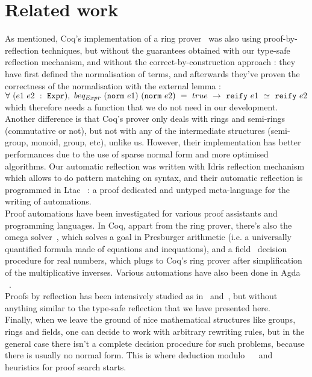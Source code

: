 \section{Related work}
\label{sect:relatedWork}

As mentioned, Coq's implementation of a ring prover~\cite{Coq2005} was also using proof-by-reflection techniques, but without the guarantees obtained with our type-safe reflection mechanism, and without the correct-by-construction approach : they have first defined the normalisation of terms, and afterwards they've proven the correctness of the normalisation with the external lemma :
$\forall\ (e1\ e2\ :\ \code{Expr}),\ beq_{Expr}\ (\code{norm}\ e1)\ (\code{norm}\ e2)\ =\ true\ \rightarrow\ \code{reify}\ e1\ \simeq\ \code{reify}\ e2$ which therefore needs a  function that we do not need in our development. Another difference is that Coq's prover only deals with rings and semi-rings (commutative or not), but not with any of the intermediate structures (semi-group, monoid, group, etc), unlike us. However, their implementation has better performances due to the use of sparse normal form and more optimised algorithms.
Our automatic reflection was written with Idris reflection mechanism which allows to do pattern matching on syntax, and their automatic reflection is programmed in Ltac~\cite{DelahayeLTac} : a proof dedicated and untyped meta-language for the writing of automations. \\

Proof automations have been investigated for various proof assistants and programming languages. In Coq, appart from the ring prover, there's also the omega solver~\cite{Cregut04}, which solves a goal in Presburger arithmetic (i.e. a universally quantified formula made of equations and inequations), and a field~\cite{DelahayeField} decision procedure for real numbers, which plugs to Coq's ring prover after simplification of the multiplicative inverses. Various automations have also been done in Agda~\cite{DBLP:conf/mpc/KokkeS15} ~\cite{Lindblad04}. \\

Proofs by reflection has been intensively studied as in~\cite{ChlipalaBook} and~\cite{Malecha14}, but without anything similar to the type-safe reflection that we have presented here. \\

Finally, when we leave the ground of nice mathematical structures like groups, rings and fields, one can decide to work with arbitrary rewriting rules, but in the general case there isn't a complete decision procedure for such problems, because there is usually no normal form. This is where deduction modulo~\cite{Dowek03} ~\cite{DelahayeModulo} and heuristics for proof search starts. \\


